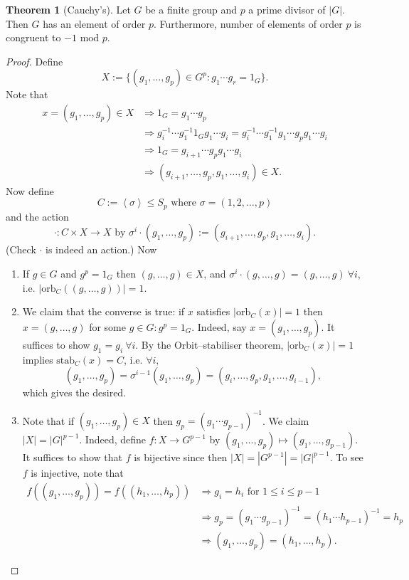\documentclass[a4paper]{article}
\newcommand{\la}{\left\langle}
\newcommand{\ra}{\right\rangle}
\newcommand{\orb}{\text{orb}}
\newcommand{\stab}{\text{stab}}
\newcommand{\Mod}{\text{ mod }}
\theoremstyle{definition}
\newtheorem{thm}[defn]{Theorem}
\begin{document}
\begin{thm}[Cauchy's]
Let $G$ be a finite group and $p$ a prime divisor of $|G|$. Then $G$ has an element of order $p$. Furthermore, number of elements of order $p$ is congruent to $-1\Mod p$.
\end{thm}
\begin{proof}
Define
\[
X:=\{(g_1,\ldots,g_p)\in G^p:g_1\cdots g_r=1_G\}.
\]
Note that
\[
\begin{aligned}
x=(g_1,\ldots,g_p)\in X &\Rightarrow 1_G=g_1\cdots g_p \\
&\Rightarrow g_i^{-1}\cdots g_1^{-1} 1_G g_1\cdots g_i=g_i^{-1}\cdots g_1^{-1} g_1\cdots g_p g_1\cdots g_i \\
&\Rightarrow 1_G=g_{i+1}\cdots g_pg_1\cdots g_i \\
&\Rightarrow (g_{i+1},\ldots ,g_p,g_1,\ldots ,g_i)\in X.
\end{aligned}
\]
Now define
\[
C:=\la\sigma\ra\leq S_p \text{ where }\sigma=(1,2,\ldots,p)
\]
and the action
\[
\cdot :C\times X\rightarrow X \text{ by } \sigma^i\cdot (g_1,\ldots,g_p):=(g_{i+1},\ldots ,g_p,g_1,\ldots ,g_i).
\]
(Check $\cdot$ is indeed an action.) Now
\begin{enumerate}
\item If $g\in G$ and $g^p=1_G$ then $(g,\ldots,g)\in X$, and $\sigma^i\cdot(g,\ldots,g)=(g,\ldots,g) \ \forall i$, i.e. $|\orb_C((g,\ldots,g))|=1$.
\item We claim that the converse is true: if $x$ satisfies $|\orb_C(x)|=1$ then $x=(g,\ldots,g)$ for some $g\in G : g^p=1_G$. Indeed, say $x=(g_1,\ldots,g_p)$. It suffices to show $g_1=g_i \ \forall i$. By the Orbit–stabiliser theorem, $|\orb_C(x)|=1$ implies $\stab_C(x)=C$, i.e. $\forall i,$
\[
(g_1,\ldots,g_p)=\sigma^{i-1}(g_1,\ldots,g_p)=(g_i,\ldots ,g_p,g_1,\ldots ,g_{i-1}),
\]
which gives the desired.
\item Note that if $(g_1,\ldots,g_p)\in X$ then $g_p=(g_1\cdots g_{p-1})^{-1}$. We claim $|X|=|G|^{p-1}$. Indeed, define $f:X\rightarrow G^{p-1}$ by $(g_1,\ldots,g_p)\mapsto (g_1,\ldots,g_{p-1})$. It suffices to show that $f$ is bijective since then $|X|=|G^{p-1}|=|G|^{p-1}$. To see $f$ is injective, note that
\[
\begin{aligned}
f((g_1,\ldots,g_p))=f((h_1,\ldots,h_p)) &\Rightarrow g_i=h_i \text{ for } 1\leq i\leq p-1 \\
&\Rightarrow g_p=(g_1\cdots g_{p-1})^{-1}=(h_1\cdots h_{p-1})^{-1}=h_p \\
&\Rightarrow (g_1,\ldots,g_p)=(h_1,\ldots,h_p).
\end{aligned}
\]
\end{enumerate}
\end{proof}
\end{document}
